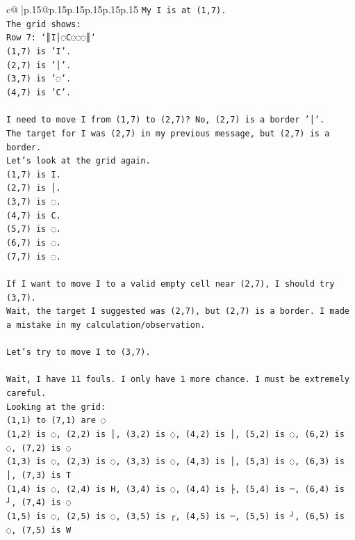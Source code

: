 \documentclass{article}
\begin{document}
{\begin{supertabular}{c@{$\;$}|p{.15\linewidth}@{}p{.15\linewidth}p{.15\linewidth}p{.15\linewidth}p{.15\linewidth}p{.15\linewidth}}
{{{\texttt{My I is at (1,7).} \\
\texttt{The grid shows:} \\
\texttt{Row 7: `║I│◌C◌◌◌║`} \\
\texttt{(1,7) is 'I'.} \\
\texttt{(2,7) is '│'.} \\
\texttt{(3,7) is '◌'.} \\
\texttt{(4,7) is 'C'.} \\
\\ 
\texttt{I need to move I from (1,7) to (2,7)? No, (2,7) is a border '│'.} \\
\texttt{The target for I was (2,7) in my previous message, but (2,7) is a border.} \\
\texttt{Let's look at the grid again.} \\
\texttt{(1,7) is I.} \\
\texttt{(2,7) is │.} \\
\texttt{(3,7) is ◌.} \\
\texttt{(4,7) is C.} \\
\texttt{(5,7) is ◌.} \\
\texttt{(6,7) is ◌.} \\
\texttt{(7,7) is ◌.} \\
\\ 
\texttt{If I want to move I to a valid empty cell near (2,7), I should try (3,7).} \\
\texttt{Wait, the target I suggested was (2,7), but (2,7) is a border. I made a mistake in my calculation/observation.} \\
\\ 
\texttt{Let's try to move I to (3,7).} \\
\\ 
\texttt{Wait, I have 11 fouls. I only have 1 more chance. I must be extremely careful.} \\
\texttt{Looking at the grid:} \\
\texttt{(1,1) to (7,1) are ◌} \\
\texttt{(1,2) is ◌, (2,2) is │, (3,2) is ◌, (4,2) is │, (5,2) is ◌, (6,2) is ◌, (7,2) is ◌} \\
\texttt{(1,3) is ◌, (2,3) is ◌, (3,3) is ◌, (4,3) is │, (5,3) is ◌, (6,3) is │, (7,3) is T} \\
\texttt{(1,4) is ◌, (2,4) is H, (3,4) is ◌, (4,4) is ├, (5,4) is ─, (6,4) is ┘, (7,4) is ◌} \\
\texttt{(1,5) is ◌, (2,5) is ◌, (3,5) is ┌, (4,5) is ─, (5,5) is ┘, (6,5) is ◌, (7,5) is W} \\
}}}
\end{supertabular}}
\end{document}
